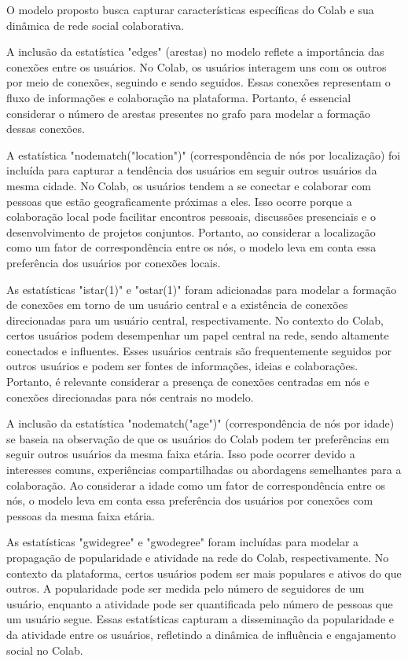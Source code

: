 O modelo proposto busca capturar características específicas do Colab e sua dinâmica de rede social colaborativa.

A inclusão da estatística "edges" (arestas) no modelo reflete a importância das conexões entre os usuários. No Colab, os usuários interagem uns com os outros por meio de conexões, seguindo e sendo seguidos. Essas conexões representam o fluxo de informações e colaboração na plataforma. Portanto, é essencial considerar o número de arestas presentes no grafo para modelar a formação dessas conexões.

A estatística "nodematch("location")" (correspondência de nós por localização) foi incluída para capturar a tendência dos usuários em seguir outros usuários da mesma cidade. No Colab, os usuários tendem a se conectar e colaborar com pessoas que estão geograficamente próximas a eles. Isso ocorre porque a colaboração local pode facilitar encontros pessoais, discussões presenciais e o desenvolvimento de projetos conjuntos. Portanto, ao considerar a localização como um fator de correspondência entre os nós, o modelo leva em conta essa preferência dos usuários por conexões locais.

As estatísticas "istar(1)" e "ostar(1)" foram adicionadas para modelar a formação de conexões em torno de um usuário central e a existência de conexões direcionadas para um usuário central, respectivamente. No contexto do Colab, certos usuários podem desempenhar um papel central na rede, sendo altamente conectados e influentes. Esses usuários centrais são frequentemente seguidos por outros usuários e podem ser fontes de informações, ideias e colaborações. Portanto, é relevante considerar a presença de conexões centradas em nós e conexões direcionadas para nós centrais no modelo.

A inclusão da estatística "nodematch("age")" (correspondência de nós por idade) se baseia na observação de que os usuários do Colab podem ter preferências em seguir outros usuários da mesma faixa etária. Isso pode ocorrer devido a interesses comuns, experiências compartilhadas ou abordagens semelhantes para a colaboração. Ao considerar a idade como um fator de correspondência entre os nós, o modelo leva em conta essa preferência dos usuários por conexões com pessoas da mesma faixa etária.

As estatísticas "gwidegree" e "gwodegree" foram incluídas para modelar a propagação de popularidade e atividade na rede do Colab, respectivamente. No contexto da plataforma, certos usuários podem ser mais populares e ativos do que outros. A popularidade pode ser medida pelo número de seguidores de um usuário, enquanto a atividade pode ser quantificada pelo número de pessoas que um usuário segue. Essas estatísticas capturam a disseminação da popularidade e da atividade entre os usuários, refletindo a dinâmica de influência e engajamento social no Colab.

